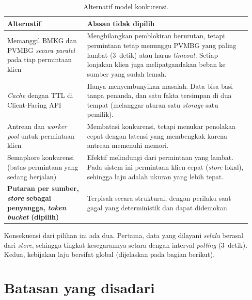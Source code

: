 \begin{table}[H]
\centering\small
\begin{tabularx}{\textwidth}{@{}L{4.2cm}Y@{}}
\toprule
\textbf{Alternatif} & \textbf{Alasan tidak dipilih}\\
\midrule
Memanggil BMKG dan PVMBG \emph{secara paralel} pada tiap permintaan klien & Menghilangkan pemblokiran berurutan, tetapi permintaan tetap menunggu PVMBG yang paling lambat (3~detik) atau harus \emph{timeout}. Setiap lonjakan klien juga melipatgandakan beban ke sumber yang sudah lemah.\\
\emph{Cache} dengan TTL di Client-Facing API & Hanya menyembunyikan masalah. Data bisa basi tanpa penanda, dan satu fakta tersimpan di dua tempat (melanggar aturan satu \emph{storage} satu pemilik).\\
Antrean dan \emph{worker pool} untuk permintaan klien & Membatasi konkurensi, tetapi menukar penolakan cepat dengan latensi yang membengkak karena antrean memenuhi memori.\\
Semaphore konkurensi (batas permintaan yang sedang berjalan) & Efektif melindungi dari permintaan yang lambat. Pada sistem ini permintaan klien cepat (\emph{store} lokal), sehingga laju adalah ukuran yang lebih tepat.\\
\textbf{Putaran per sumber, \emph{store} sebagai penyangga, \emph{token bucket} (dipilih)} & Terpisah secara struktural, dengan perilaku saat gagal yang deterministik dan dapat didemokan.\\
\bottomrule
\end{tabularx}
\caption{Alternatif model konkurensi.}
\end{table}

Konsekuensi dari pilihan ini ada dua. Pertama, data yang dilayani \emph{selalu} berasal dari \emph{store}, sehingga tingkat
kesegarannya setara dengan interval \emph{polling} (3~detik). Kedua, kebijakan laju bersifat global (dijelaskan pada bagian
berikut).

\section{Batasan yang disadari}

